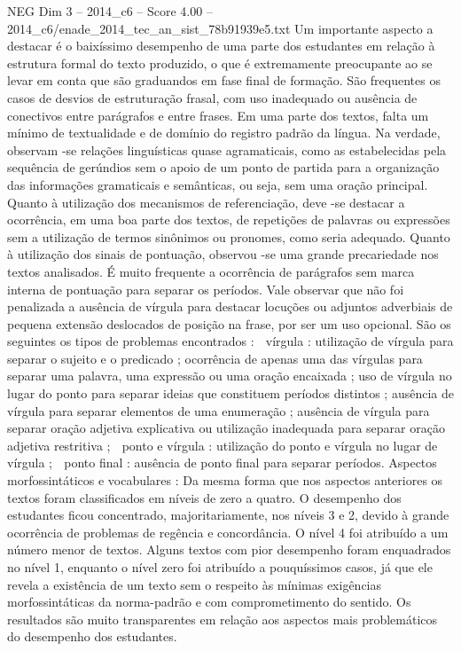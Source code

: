 \begin{textsample}{NEG Dim 3 – 2014\_c6 – Score 4.00 – 2014\_c6/enade\_2014\_tec\_an\_sist\_78b91939e5.txt}
Um importante aspecto a destacar é o baixíssimo desempenho de uma parte dos estudantes em relação à estrutura formal do texto produzido, o que é extremamente preocupante ao se levar em conta que são graduandos em fase final de formação.
São frequentes os casos de desvios de estruturação frasal, com uso inadequado ou ausência de conectivos entre parágrafos e entre frases.
Em uma parte dos textos, falta um mínimo de textualidade e de domínio do registro padrão da língua.
Na verdade, observam -se relações linguísticas quase agramaticais, como as estabelecidas pela sequência de gerúndios sem o apoio de um ponto de partida para a organização das informações gramaticais e semânticas, ou seja, sem uma oração principal.
Quanto à utilização dos mecanismos de referenciação, deve -se destacar a ocorrência, em uma boa parte dos textos, de repetições de palavras ou expressões sem a utilização de termos sinônimos ou pronomes, como seria adequado.
Quanto à utilização dos sinais de pontuação, observou -se uma grande precariedade nos textos analisados.
É muito frequente a ocorrência de parágrafos sem marca interna de pontuação para separar os períodos.
Vale observar que não foi penalizada a ausência de vírgula para destacar locuções ou adjuntos adverbiais de pequena extensão deslocados de posição na frase, por ser um uso opcional.
São os seguintes os tipos de problemas encontrados :  vírgula : utilização de vírgula para separar o sujeito e o predicado ; ocorrência de apenas uma das vírgulas para separar uma palavra, uma expressão ou uma oração encaixada ; uso de vírgula no lugar do ponto para separar ideias que constituem períodos distintos ; ausência de vírgula para separar elementos de uma enumeração ; ausência de vírgula para separar oração adjetiva explicativa ou utilização inadequada para separar oração adjetiva restritiva ;  ponto e vírgula : utilização do ponto e vírgula no lugar de vírgula ;  ponto final : ausência de ponto final para separar períodos.
Aspectos morfossintáticos e vocabulares : Da mesma forma que nos aspectos anteriores os textos foram classificados em níveis de zero a quatro.
O desempenho dos estudantes ficou concentrado, majoritariamente, nos níveis 3 e 2, devido à grande ocorrência de problemas de regência e concordância.
O nível 4 foi atribuído a um número menor de textos.
Alguns textos com pior desempenho foram enquadrados no nível 1, enquanto o nível zero foi atribuído a pouquíssimos casos, já que ele revela a existência de um texto sem o respeito às mínimas exigências morfossintáticas da norma-padrão e com comprometimento do sentido.
Os resultados são muito transparentes em relação aos aspectos mais problemáticos do desempenho dos estudantes.

\end{textsample}
